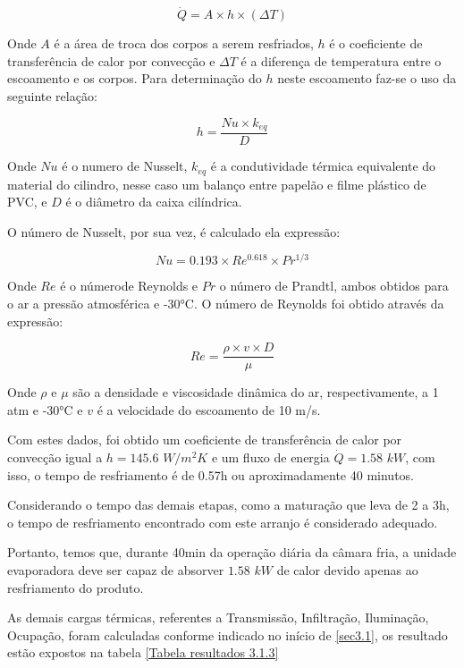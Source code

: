 \documentclass[10pt,a4paper]{article}
\begin{document}
\begin{equation}
    \dot{Q} = A \times h \times (\Delta T)
\end{equation}

\noindent Onde $A$ é a área de troca dos corpos a serem resfriados, $h$ é o coeficiente de transferência de calor por convecção e $\Delta T$ é a diferença de temperatura entre o escoamento e os corpos. Para determinação do $h$ neste escoamento faz-se o uso da seguinte relação:

\begin{equation}
    h = \frac{Nu \times k_{eq}}{D}
\end{equation}

\noindent Onde $Nu$ é o numero de Nusselt, $k_{eq}$ é a condutividade térmica equivalente do material do cilindro, nesse caso um balanço entre papelão e filme plástico de PVC, e $D$ é o diâmetro da caixa cilíndrica.

O número de Nusselt, por sua vez, é calculado ela expressão:

\begin{equation}
    Nu = 0.193 \times Re^{0.618} \times Pr^{1/3}
\end{equation}

\noindent Onde $Re$ é o númerode Reynolds e $Pr$ o número de Prandtl, ambos obtidos para o ar a pressão atmosférica e -30°C. O número de Reynolds foi obtido através da expressão:

\begin{equation}
    Re = \frac{\rho \times v \times D}{\mu}
\end{equation}

Onde $\rho$ e $\mu$ são a densidade e viscosidade dinâmica do ar, respectivamente, a 1 atm e -30°C e $v$ é a velocidade do escoamento de 10 m/s.

Com estes dados, foi obtido um coeficiente de transferência de calor por convecção igual a $h = 145.6$ ${W}/{m^{2}K}$ e um fluxo de energia $\dot{Q} = 1.58$ $kW$, com isso, o tempo de resfriamento é de 0.57h ou aproximadamente 40 minutos.

Considerando o tempo das demais etapas, como a maturação que leva de 2 a 3h, o tempo de resfriamento encontrado com este arranjo é considerado adequado.

Portanto, temos que, durante 40min da operação diária da câmara fria, a unidade evaporadora deve ser capaz de absorver $1.58$ $kW$ de calor devido apenas ao resfriamento do produto. 

As demais cargas térmicas, referentes a Transmissão, Infiltração, Iluminação, Ocupação, foram calculadas conforme indicado no início de \ref{sec3.1}, os resultado estão expostos na tabela \ref{Tabela resultados 3.1.3}
\end{document}
